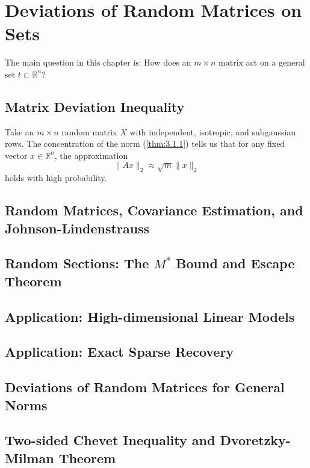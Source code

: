 \section{Deviations of Random Matrices on Sets}
The main question in this chapter is: How does an $m \times n$ matrix act on a general set $t \subset 
\mathbb{R}^n$? 



\subsection{Matrix Deviation Inequality}
Take an $m \times n$ random matrix $X$ with independent, isotropic, and subgaussian rows. The concentration of 
the norm (\cref{thm:3.1.1}) tells us that for any fixed vector $x \in \mathbb{R}^n$, the approximation 
\[ \lVert Ax \rVert_{2} \approx \sqrt{m}\lVert x \rVert_{2} \]
holds with high probability.




\subsection{Random Matrices, Covariance Estimation, and Johnson-Lindenstrauss}



\subsection{Random Sections: The \texorpdfstring{$M^*$}{} Bound and Escape Theorem}



\subsection{Application: High-dimensional Linear Models}



\subsection{Application: Exact Sparse Recovery}



\subsection{Deviations of Random Matrices for General Norms}



\subsection{Two-sided Chevet Inequality and Dvoretzky-Milman Theorem}



